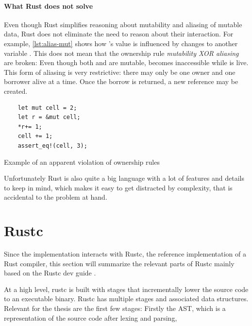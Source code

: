 \documentclass[twoside, english]{sdqthesis}
\theoremstyle{definition}
\begin{document}
\paragraph*{What Rust does not solve} Even though Rust simplifies reasoning about mutability and aliasing of mutable data, Rust does not eliminate the need to reason about their interaction. For example, \cref{lst:alias-mut} shows how 's value is influenced by changes to another variable . This does not mean that the ownership rule  \textit{mutability XOR aliasing} are broken: Even though both  and  are mutable,  becomes inaccessible while  is live.
This form of aliasing is very restrictive: there may only be one owner and one borrower alive at a time. Once the borrow is returned, a new reference may be created.

\begin{listing}[ht]
  \begin{verbatim}
    let mut cell = 2;
    let r = &mut cell;
    *r+= 1;
    cell += 1;
    assert_eq!(cell, 3);
  \end{verbatim}
  \caption{Example of an apparent violation of ownership rules}
  \label{lst:alias-mut}
\end{listing}

Unfortunately Rust is also quite a big language with a lot of features and details to keep in mind, which makes it easy to get distracted by complexity, that is accidental to the problem at hand.

\section{Rustc}

Since the implementation interacts with Rustc, the reference implementation of a Rust compiler, this section will summarize the relevant parts of Rustc mainly based on the Rustc dev guide \cite{noauthor_overview_nodate}.

At a high level, rustc is built with stages that incrementally lower the source code to an executable binary. Rustc has multiple stages and associated data structures. 
Relevant for the thesis are the first few stages: Firstly the AST, which is a representation of the source code after lexing and parsing, 
\end{document}
